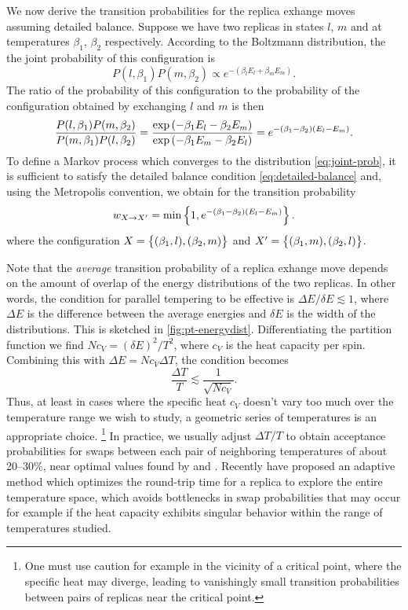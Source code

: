 We now derive the transition probabilities for the replica exhange moves
assuming detailed balance. Suppose we have two replicas in states $l$, $m$ and
at temperatures $\beta_1$, $\beta_2$ respectively. According to the Boltzmann
distribution, the the joint probability of this configuration is
\begin{equation}
  P(l,\beta_1) P(m,\beta_2) \propto
  e^{-(\beta_l E_l + \beta_m E_m)}.
  \label{eq:joint-prob}
\end{equation}
The ratio of the probability of this configuration to the probability of the
configuration obtained by exchanging $l$ and $m$ is then
\begin{equation}
  \frac{P(l,\beta_1) P(m,\beta_2)}
       {P(m,\beta_1) P(l,\beta_2)} =
  \frac{\exp\left(-\beta_1 E_l - \beta_2 E_m\right)}
       {\exp\left(-\beta_1 E_m - \beta_2 E_l\right)} =
  e^{-(\beta_1-\beta_2)(E_l-E_m)}.
\end{equation}
To define a Markov process which converges to the distribution
\eqref{eq:joint-prob}, it is sufficient to satisfy the detailed balance
condition \eqref{eq:detailed-balance} and, using the Metropolis convention, we
obtain for the transition probability
\begin{equation}
  w_{X \to X^{\prime}}
  = \min\cbr{1, e^{-(\beta_1-\beta_2)(E_l-E_m)}}.
\end{equation}
where the configuration
$X=\cbr{(\beta_1,l),(\beta_2,m)}$ and
$X^{\prime}=\cbr{(\beta_1,m),(\beta_2,l)}$.

Note that the \emph{average} transition probability of a replica exhange move
depends on the amount of overlap of the energy distributions of the two
replicas. In other words, the condition for parallel tempering to be effective
is $\Delta E / \delta E \lesssim 1$, where $\Delta E$ is the difference between
the average energies and $\delta E$ is the width of the distributions. This is
sketched in \cref{fig:pt-energydist}. Differentiating the partition function we
find $N c_V = (\delta E)^2 / T^2$, where $c_V$ is the heat capacity per spin.
Combining this with $\Delta E = N c_V \Delta T$, the condition becomes
\begin{equation}
  \frac{\Delta T}{T} \lesssim \frac{1}{\sqrt{N c_V}}.
\end{equation}
Thus, at least in cases where the specific heat $c_V$ doesn't vary too much
over the temperature range we wish to study, a geometric series of temperatures
is an appropriate choice.%
\footnote{%
  One must use caution for example in the vicinity of a critical point, where
  the specific heat may diverge, leading to vanishingly small transition
  probabilities between pairs of replicas near the critical point.
}
In practice, we usually adjust $\Delta T/T$ to obtain acceptance probabilities
for swaps between each pair of neighboring temperatures of about 20--30\%, near
optimal values found by \textcite{rathore2005optimal} and
\textcite{kone2005selection}. Recently \textcite{katzgraber2006feedback} have
proposed an adaptive method which optimizes the round-trip time for a replica
to explore the entire temperature space, which avoids bottlenecks in swap
probabilities that may occur for example if the heat capacity exhibits singular
behavior within the range of temperatures studied.

